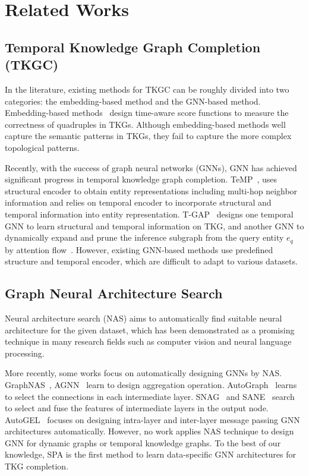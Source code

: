 \documentclass[11pt]{article}
\begin{document}
\section{Related Works}

\subsection{Temporal Knowledge Graph Completion (TKGC)}
 
In the literature, 
existing methods for TKGC can be roughly divided into two categories: the embedding-based method and the GNN-based method. 
Embedding-based methods~\citep{leblay2018deriving,dasgupta-etal-2018-hyte,goel2020diachronic,lacroix2020tensor, messner2022temporal}
design time-aware score functions to measure the correctness of quadruples in TKGs. 
Although embedding-based methods well capture the semantic patterns in TKGs, 
they fail to capture the more complex topological patterns.

Recently, 
with the success of graph neural networks (GNNs), 
GNN has achieved significant progress in temporal knowledge graph completion. 
TeMP~\citep{wu-etal-2020-temp},
uses structural encoder to obtain entity representations including multi-hop neighbor information 
and relies on temporal encoder to incorporate structural and temporal information into entity representation. 
T-GAP~\citep{jung2021learning} designs one temporal GNN to learn structural and temporal information on TKG, 
and another GNN to dynamically expand and prune the inference subgraph from the query entity $e_q$ by attention flow~\citep{xu2018modeling}. 
However, 
existing GNN-based methods use predefined structure and temporal encoder, 
which are difficult to adapt to various datasets. 

\subsection{Graph Neural Architecture Search}

Neural architecture search (NAS) aims to automatically find suitable neural architecture for the given dataset, 
which has been demonstrated as a promising technique in many research fields such as computer vision and neural language processing. 

More recently, 
some works focus on automatically designing GNNs by NAS. 
GraphNAS~\citep{gao2021graph}, AGNN~\citep{zhou2019auto} learn to design aggregation operation. 
AutoGraph~\citep{li2020autograph} learns to select the connections in each intermediate layer. 
SNAG~\citep{zhao2020simplifying} and SANE~\citep{huan2021search} search to select and fuse the features of intermediate layers in the output node. 
AutoGEL~\citep{wang2021autogel} focuses on designing intra-layer and inter-layer message passing GNN architectures automatically. 
However, 
no work applies NAS technique to design GNN for dynamic graphs or temporal knowledge graphs. 
To the best of our knowledge, 
SPA is the first method to learn data-specific GNN architectures for TKG completion.
\end{document}
